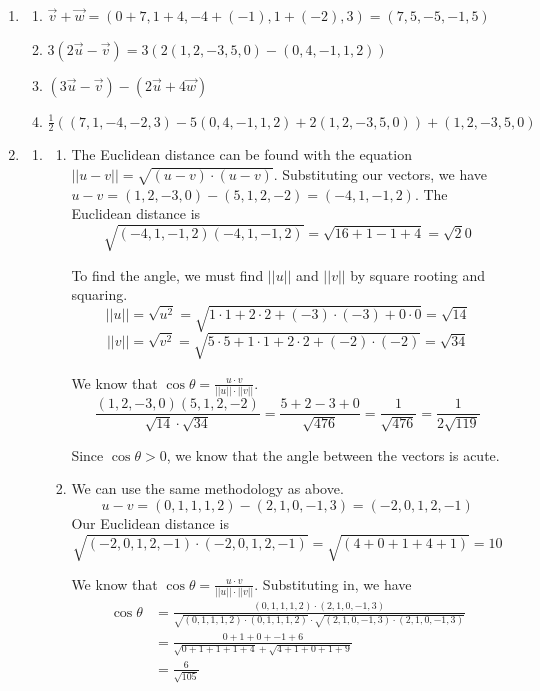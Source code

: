 \documentclass[11pt, letterpaper, twoside]{article}
\begin{document}
\begin{enumerate}
\item 
\begin{enumerate}[label=\alph*)]
\item ‌‌\(\vec v + \vec w = (0+7, 1+4, -4+(-1), 1+(-2), 3) = (7, 5,-5,-1,5)\)
\item \(3(2\vec u - \vec v)=3(2(1,2,-3,5,0)-(0,4,-1,1,2))\)
\item \((3\vec u - \vec v)-(2\vec u + 4\vec w)\)
\item \(\frac{1}{2}((7,1,-4,-2,3) -5(0,4,-1,1,2) +2(1,2,-3,5,0))+(1,2,-3,5,0)\)
\end{enumerate}
\item \begin{enumerate}[label=\alph*]
\item
\begin{enumerate}[label=\roman*)]
\item The Euclidean distance can be found with the equation \(||u-v||=\sqrt{(u-v)\cdot(u-v)}\). 
Substituting our vectors, we have \(u-v=(1,2,-3,0)-(5,1,2,-2)=(-4,1,-1,2)\). The Euclidean distance is 
\[\sqrt{(-4,1,-1,2)(-4,1,-1,2)}=\sqrt{16+1-1+4}=\sqrt20\]

To find the angle, we must find \(||u||\) and \(||v||\) by square rooting and squaring.
\[||u|| = \sqrt{u^2} = \sqrt{1\cdot1+2\cdot2+(-3)\cdot(-3)+0\cdot0}=\sqrt{14}\]
\[||v||=\sqrt{v^2}=\sqrt{5\cdot5+1\cdot1+2\cdot2+(-2)\cdot(-2)}=\sqrt{34}\]

We know that \(\cos\theta=\frac{u\cdot v}{||u||\cdot||v||}.\)
\[\frac{(1,2,-3,0)(5,1,2,-2)}{\sqrt{14}\cdot\sqrt{34}}=\frac{5+2-3+0}{\sqrt{476}}=\frac{1}{\sqrt{476}}=\frac{1}{2\sqrt{119}}\]

Since \(\cos\theta>0\), we know that the angle between the vectors is acute.

\item We can use the same methodology as above. 
\[u-v=(0,1,1,1,2)-(2,1,0,-1,3)=(-2,0,1,2,-1)\]
Our Euclidean distance is 
\[\sqrt{(-2,0,1,2,-1)\cdot(-2,0,1,2,-1)}=\sqrt{(4+0+1+4+1)}=10\]

We know that \(\cos\theta=\frac{u\cdot v}{||u||\cdot||v||}.\) Substituting in, we have 
\begin{align*}
\cos\theta&=\frac{(0,1,1,1,2)\cdot(2,1,0,-1,3)}{\sqrt{(0,1,1,1,2)\cdot(0,1,1,1,2)}\cdot\sqrt{(2,1,0,-1,3)\cdot(2,1,0,-1,3)}}\\
&=\frac{0+1+0+-1+6}{\sqrt{0+1+1+1+4}+\sqrt{4+1+0+1+9}}\\
&=\frac{6}{\sqrt{105}}
\end{align*}


\end{enumerate}
\end{enumerate}
\end{enumerate}
\end{document}
